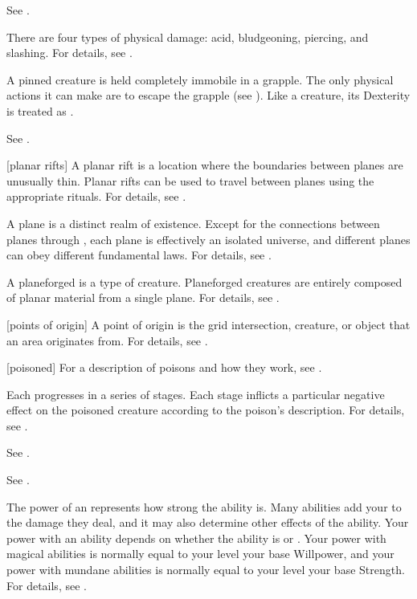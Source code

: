  See .

 There are four types of physical damage: acid, bludgeoning, piercing, and slashing.
For details, see .

 A pinned creature is held completely immobile in a grapple.
The only physical actions it can make are to escape the grapple (see ).
Like a  creature, its Dexterity is treated as .

 See .

[planar rifts] A planar rift is a location where the boundaries between planes are unusually thin.
Planar rifts can be used to travel between planes using the appropriate rituals.
For details, see .

 A plane is a distinct realm of existence.
Except for the connections between planes through , each plane is effectively an isolated universe, and different planes can obey different fundamental laws.
For details, see .

 A planeforged is a type of creature.
Planeforged creatures are entirely composed of planar material from a single plane.
For details, see .

[points of origin] A point of origin is the grid intersection, creature, or object that an area originates from.
For details, see .

[poisoned] For a description of poisons and how they work, see .

 Each  progresses in a series of stages.
Each stage inflicts a particular negative effect on the poisoned creature according to the poison's description.
For details, see .

 See .

 See .

 The power of an  represents how strong the ability is.
Many abilities add your  to the damage they deal, and it may also determine other effects of the ability.
Your power with an ability depends on whether the ability is  or .
Your power with magical abilities is normally equal to your level \add your base Willpower, and your power with mundane abilities is normally equal to your level \add your base Strength.
For details, see .


